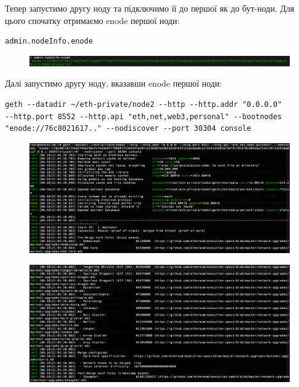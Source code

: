 \newpage
Тепер запустимо другу ноду та підключимо її до першої як до бут-ноди.
Для цього спочатку отримаємо enode першої ноди:
\begin{verbatim}
admin.nodeInfo.enode
\end{verbatim}

\vspace{-0.5cm}

\begin{figure}[ht]
        \centering
        \includegraphics[scale=0.35]{IMAGES/enode.png}
        \label{fig_pacman}
\end{figure}

Далі запустимо другу ноду, вказавши enode першої ноди:
\begin{verbatim}
geth --datadir ~/eth-private/node2 --http --http.addr "0.0.0.0" 
--http.port 8552 --http.api "eth,net,web3,personal" --bootnodes
"enode://76c8021617.." --nodiscover --port 30304 console
\end{verbatim}

\vspace{-0.5cm}

\begin{figure}[ht]
        \centering
        \includegraphics[scale=0.35]{IMAGES/launch21.png}
        \label{fig_pacman}
\end{figure}
\vspace{-1cm}
\begin{figure}[ht]
        \centering
        \includegraphics[scale=0.35]{IMAGES/launch22.png}
        \label{fig_pacman}
\end{figure}

